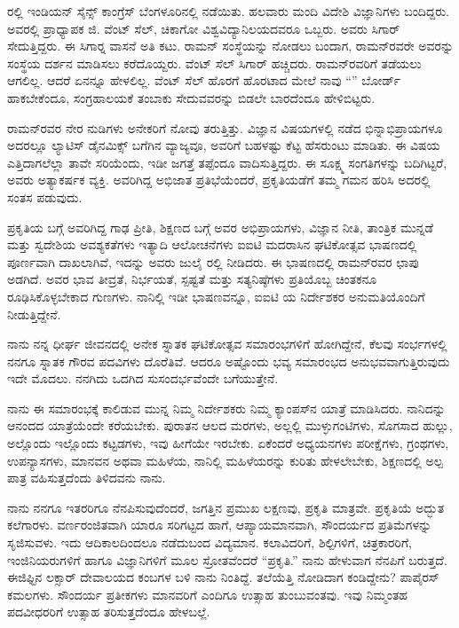 ರಲ್ಲಿ ಇಂಡಿಯನ್ ಸೈನ್ಸ್ ಕಾಂಗ್ರೆಸ್ ಬೆಂಗಳೂರಿನಲ್ಲಿ ನಡೆಯಿತು. ಹಲವಾರು ಮಂದಿ ವಿದೇಶಿ ವಿಜ್ಞಾನಿಗಳು ಬಂದಿದ್ದರು. ಅವರಲ್ಲಿ ಪ್ರಾಧ್ಯಾಪಕ ಜಿ. ವೆಂಟ್ ಸೆಲ್, ಚಿಕಾಗೋ ವಿಶ್ವವಿದ್ಯಾನಿಲಯದವರೂ ಒಬ್ಬರು. ಅವರು ಸಿಗಾರ್ ಸೇದುತ್ತಿದ್ದರು. ಈ ಸಿಗಾರ್‍ನ ವಾಸನೆ ಅತಿ ಕಟು. ರಾಮನ್ ಸಂಸ್ಥೆಯನ್ನು ನೋಡಲು ಬಂದಾಗ, ರಾಮನ್‍ರವರೇ ಅವರನ್ನು ಸಂಸ್ಥೆಯ ದರ್ಶನ ಮಾಡಿಸಲು ಕರೆದೊಯ್ದರು. ವೆಂಟ್ ಸೆಲ್ ಸಿಗಾರ್ ಹಚ್ಚಿದರು. ರಾಮನ್‍ರವರಿಗೆ ತಡೆಯಲು ಆಗಲಿಲ್ಲ. ಆದರೆ ಏನನ್ನೂ ಹೇಳಲಿಲ್ಲ. ವೆಂಟ್ ಸೆಲ್ ಹೊರಗೆ ಹೊರಟಾದ ಮೇಲೆ ನಾವು “” ಬೋರ್ಡ್ ಹಾಕಬೇಕೆಂದೂ, ಸಂಗ್ರಹಾಲಯಕೆ ತಂಬಾಕು ಸೇದುವವರನ್ನು ಬಿಡಲೇ ಬಾರದೆಂದೂ ಹೇಳಿಬಿಟ್ಟರು.

\vskip 2pt

ರಾಮನ್‍ರವರ ನೇರ ನುಡಿಗಳು ಅನೇಕರಿಗೆ ನೋವು ತರುತ್ತಿತ್ತು. ವಿಜ್ಞಾನ ವಿಷಯಗಳಲ್ಲಿ ನಡೆದ ಭಿನ್ನಾಭಿಪ್ರಾಯಗಳೂ ಅದರಲ್ಲೂ ಲ್ಯಾಟಿಸ್ ಡೈನಮಿಕ್ಸ್ ಬಗೆಗಿನ ವ್ಯಾಜ್ಯವೂ, ಅವರಿಗೆ ಬಹಳಷ್ಟು ಕೆಟ್ಟ ಹೆಸರುಂಟು ಮಾಡಿತು. ಈ ವಿಷಯ ಎತ್ತಿದಾಗಲೆಲ್ಲಾ ತಾವೇ ಸರಿಯೆಂದು, ಇಡೀ ಜಗತ್ತೆ ತಪ್ಪೆಂದೂ ವಾದಿಸುತ್ತಿದ್ದರು. ಈ ಸೂಕ್ಷ್ಮ ಸಂಗತಿಗಳನ್ನು ಬದಿಗಿಟ್ಟರೆ, ಅವರು ಅತ್ಯಾಕರ್ಷಕ ವ್ಯಕ್ತಿ. ಅವರಿಗಿದ್ದ ಅಭಿಜಾತ ಪ್ರತಿಭೆಯೆಂದರೆ, ಪ್ರಕೃತಿಯಡೆಗೆ ತಮ್ಮ ಗಮನ ಹರಿಸಿ ಅದರಲ್ಲಿ ಸಂತಸ ಪಡುವುದು.

\vskip 2pt

ಪ್ರಕೃತಿಯ ಬಗ್ಗೆ ಅವರಿಗಿದ್ದ ಗಾಢ ಪ್ರೀತಿ, ಶಿಕ್ಷಣದ ಬಗ್ಗೆ ಅವರ ಅಭಿಪ್ರಾಯಗಳು, ವಿಜ್ಞಾನ ನೀತಿ, ತಾಂತ್ರಿಕ ಮುನ್ನಡೆ ಮತ್ತು ಸ್ವದೇಶಿಯ ಅವಶ್ಯಕತೆಗಳು ಇತ್ಯಾದಿ ಆಲೋಚನೆಗಳು ಐಐಟಿ ಮದರಾಸಿನ ಘಟಿಕೋತ್ಸವ ಭಾಷಣದಲ್ಲಿ ಪೂರ್ಣವಾಗಿ ದಾಖಲಾಗಿವೆ, ಇದನ್ನು ಅವರು  ಜುಲೈ ರಲ್ಲಿ ನೀಡಿದರು. ಈ ಭಾಷಣದಲ್ಲಿ ರಾಮನ್‍ರವರ ಛಾಪು ಅಡಗಿದೆ. ಅವರ ಭಾವ ತೀವ್ರತೆ, ನಿರ್ಭಯತೆ, ಸ್ಪಷ್ಟತೆ ಮತ್ತು ಸತ್ಯನಿಷ್ಠೆಗಳು ಪ್ರತಿಯೊಬ್ಬ ಚಿಂತಕನೂ ರೂಢಿಸಿಕೊಳ್ಳಬೇಕಾದ ಗುಣಗಳು. ನಾನಿಲ್ಲಿ ಇಡೀ ಭಾಷಣವನ್ನೂ, ಐಐಟಿ ಯ ನಿರ್ದೇಶಕರ ಅನುಮತಿಯೊಂದಿಗೆ ನೀಡುತ್ತಿದ್ದೇನೆ.



ನಾನು ನನ್ನ ಧೀರ್ಘ ಜೀವನದಲ್ಲಿ ಅನೇಕ ಸ್ನಾತಕ ಘಟಿಕೋತ್ಸವ ಸಮಾರಂಭಗಳಿಗೆ ಹೋಗಿದ್ದೇನೆ, ಕೆಲವು ಸಂರ್ಭಗಳಲ್ಲಿ ನನಗೂ ಸ್ನಾತಕ ಗೌರವ ಪದವಿಗಳು ದೊರೆತಿವೆ. ಆದರೂ ಅಷ್ಟೊಂದು ಭವ್ಯ ಸಮಾರಂಭದ ಅನುಭವವಾಗುತ್ತಿರುವುದು ಇದೇ ಮೊದಲು. ನನಗಿದು ಒದಗಿದ ಸುಸಂದರ್ಭವೆಂದೇ ಬಗೆಯುತ್ತೇನೆ.

ನಾನು ಈ ಸಮಾರಂಭಕ್ಕೆ ಕಾಲಿಡುವ ಮುನ್ನ ನಿಮ್ಮ ನಿರ್ದೇಶಕರು ನಿಮ್ಮ ಕ್ಯಾಂಪಸ್‍ನ ಯಾತ್ರೆ ಮಾಡಿಸಿದರು. ನಾನಿದನ್ನು ಆನಂದದ ಯಾತ್ರೆಯೆಂದೇ ಕರೆಯಬೇಕು. ಪುರಾತನ ಆಲದ ಮರಗಳು, ಅಲ್ಲಲ್ಲಿ ಮುಳ್ಳುಗಂಟಿಗಳು, ಸೊಗಸಾದ ಹುಲ್ಲು, ಅಲ್ಲೊಂದು ಇಲ್ಲೊಂದು ಕಟ್ಟಡಗಳು,\enginline{--} ಇವು ಹೀಗೆಯೇ ಇರಬೇಕು. ಏಕೆಂದರೆ ಅಧ್ಯಯನಗಳು ಪರೀಕ್ಷೆಗಳು, ಗ್ರಂಥಗಳು, ಉಪನ್ಯಾಸಗಳು, ಮಾನವನ ಅಥವಾ ಮಹಿಳೆಯ, ನಾನಿಲ್ಲಿ ಮಹಿಳೆಯರನ್ನು ಕುರಿತು ಹೇಳಲೇಬೇಕು, ಶಿಕ್ಷಣದಲ್ಲಿ ಅಲ್ಪ ಪಾತ್ರ ವಹಿಸುತ್ತದೆಂದು ತಿಳಿದವನು ನಾನು.

\newpage

ನಾನು ನನಗೂ ಇತರರಿಗೂ ನೆನಪಿಸುವುದೆಂದರೆ, ಜಗತ್ತಿನ ಪ್ರಮುಖ ಲಕ್ಷಣವು, ಪ್ರಕೃತಿ ಮಾತ್ರವೇ. ಪ್ರಕೃತಿಯೆ ಅದ್ಭುತ ಕಲೆಗಾರಳು. ವರ್ಣರಂಜಿತವಾಗಿ ಯಾರೂ ಸರಿಗಟ್ಟದ ಹಾಗೆ, ಆಪ್ಯಾಯಮಾನವಾಗಿ, ಸೌಂದರ್ಯದ ಪ್ರತಿಮೆಗಳನ್ನು ಸೃಜಿಸುವಳು. ಇದು ಆದಿಕಾಲದಿಂದಲೂ ನಡೆದುಬಂದ ವಿದ್ಯಮಾನ. ಕಲಾವಿದರಿಗೆ, ಶಿಲ್ಪಿಗಳಿಗೆ, ಚಿತ್ರಕಾರರಿಗೆ, ಇಂಜಿನಿಯರುಗಳಿಗೆ ಹಾಗೂ ವಿಜ್ಞಾನಿಗಳಿಗೆ ಮೂಲ ಸ್ರೋತವೆಂದರೆ “ಪ್ರಕೃತಿ.” ನಾನು ಹೇಳುವಾಗ ನೆನಪಿಗೆ ಬರುತ್ತದೆ. ಈಜಿಫ್ಟಿನ ಲಕ್ಸಾರ್ ದೇವಾಲಯದ ಕಂಬಗಳ ಬಳಿ ನಾನು ನಿಂತಿದ್ದೆ. ತಲೆಯೆತ್ತಿ ನೋಡಿದಾಗ ಕಂಡಿದ್ದೇನು? ಪಾಪೈರಸ್ ಕಮಲಗಳು. ಸೌಂದರ್ಯ ಪ್ರತೀಕಗಳು ಮಾನವರಿಗೆ ಎಂದಿಗೂ ಉತ್ಸಾಹ ತುಂಬುವಂತವು. ಇವು ನಿಮ್ಮಂತಹ ಪದವೀಧರರಿಗೆ ಉತ್ಸಾಹ ತರಿಸುತ್ತದೆಂದೂ ಹೇಳಬಲ್ಲೆ.

